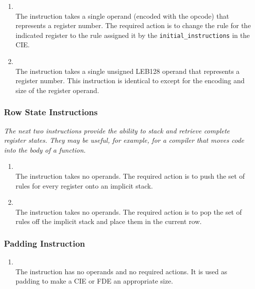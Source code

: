 \begin{enumerate}[1. ]
\item \textbf{\DWCFArestoreTARG} \\
The \DWCFArestoreTARG{} instruction takes a single operand (encoded
with the opcode) that represents a register number. The
required action is to change the rule for the indicated
register to the rule assigned it by the \texttt{initial\_instructions}
in the CIE.

\item \textbf{\DWCFArestoreextendedTARG} \\
The \DWCFArestoreextendedTARG{}
instruction takes a single unsigned LEB128 
operand that represents a register number. This
instruction is identical to \DWCFArestore{} except for the
encoding and size of the register operand.

\end{enumerate}

\subsubsection{Row State Instructions}
\label{chap:rowstateinstructions}

\textit{The next two instructions provide the ability to stack and
retrieve complete register states. They may be useful, for
example, for a compiler that moves  code 
into the
body of a function.}


\begin{enumerate}[1. ]

\item \textbf{\DWCFArememberstateTARG} \\
The \DWCFArememberstateTARG{} instruction takes no operands. The
required action is to push the set of rules for every register
onto an implicit stack.

\item \textbf{\DWCFArestorestateTARG} \\
The \DWCFArestorestateTARG{} instruction takes no operands. The
required action is to pop the set of rules off the implicit
stack and place them in the current row.

\end{enumerate}

\subsubsection{Padding Instruction}
\label{chap:paddinginstruction}
\begin{enumerate}[1. ]
\item \textbf{\DWCFAnopTARG} \\
The \DWCFAnopTARG{} instruction has no operands and no required
actions. It is used as padding to make a CIE or FDE an
appropriate size.

\end{enumerate}


